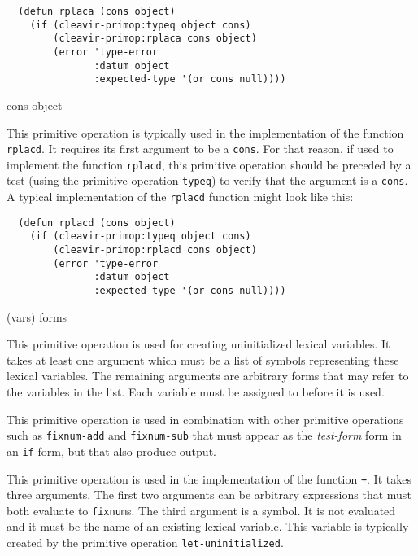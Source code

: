 \begin{verbatim}
  (defun rplaca (cons object)
    (if (cleavir-primop:typeq object cons)
        (cleavir-primop:rplaca cons object)
        (error 'type-error
               :datum object
               :expected-type '(or cons null))))
\end{verbatim}

 {cons object}

This primitive operation is typically used in the implementation of
the \commonlisp{} function \texttt{rplacd}.  It requires its first
argument to be a \texttt{cons}.  For that reason, if used to implement
the \commonlisp{} function \texttt{rplacd}, this primitive operation
should be preceded by a test (using the primitive operation
\texttt{typeq}) to verify that the argument is a \texttt{cons}.  A
typical implementation of the \texttt{rplacd} function might look like
this:

\begin{verbatim}
  (defun rplacd (cons object)
    (if (cleavir-primop:typeq object cons)
        (cleavir-primop:rplacd cons object)
        (error 'type-error
               :datum object
               :expected-type '(or cons null))))
\end{verbatim}

 {(\rest vars) \body forms}

This primitive operation is used for creating uninitialized lexical
variables.  It takes at least one argument which must be a list of
symbols representing these lexical variables.  The remaining arguments
are arbitrary forms that may refer to the variables in the list.  Each
variable must be assigned to before it is used.

This primitive operation is used in combination with other primitive
operations such as \texttt{fixnum-add} and \texttt{fixnum-sub} that
must appear as the \emph{test-form} form in an \texttt{if} form, but
that also produce output.

 {}

This primitive operation is used in the implementation of the
\commonlisp{} function \texttt{+}.  It takes three arguments.  The
first two arguments can be arbitrary expressions that must both
evaluate to \texttt{fixnum}s.   The third argument is a symbol.  It is
not evaluated and it must be the name of an existing lexical
variable.  This variable is typically created by the primitive
operation \texttt{let-uninitialized}.

